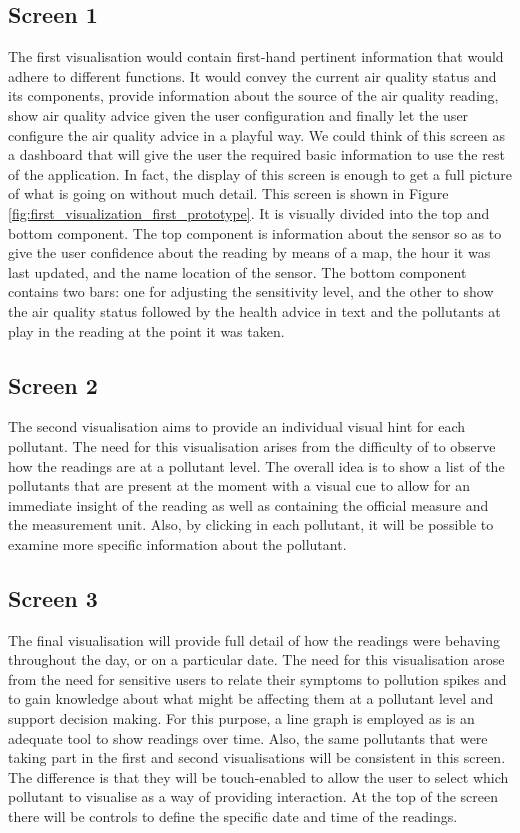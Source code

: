 \subsection{Screen 1}

The first visualisation would contain first-hand pertinent information that would adhere to different functions. It would convey the current air quality status and its components, provide information about the source of the air quality reading, show air quality advice given the user configuration and finally let the user configure the air quality advice in a playful way. We could think of this screen as a dashboard that will give the user the required basic information to use the rest of the application. In fact, the display of this screen is enough to get a full picture of what is going on without much detail.
This screen is shown in Figure \ref{fig:first_visualization_first_prototype}. It is visually divided into the top and bottom component. The top component is information about the sensor so as to give the user confidence about the reading by means of a map, the hour it was last updated, and the name location of the sensor. The bottom component contains two bars: one for adjusting the sensitivity level, and the other to show the air quality status followed by the health advice in text and the pollutants at play in the reading at the point it was taken. 

\subsection{Screen 2}

The second visualisation aims to provide an individual visual hint for each pollutant. The need for this visualisation arises from the difficulty of to observe how the readings are at a pollutant level. The overall idea is to show a list of the pollutants that are present at the moment with a visual cue to allow for an immediate insight of the reading as well as containing the official measure and the measurement unit. Also, by clicking in each pollutant, it will be possible to examine more specific information about the pollutant.

\subsection{Screen 3}

The final visualisation will provide full detail of how the readings were behaving throughout the day, or on a particular date. The need for this visualisation arose from the need for sensitive users to relate their symptoms to pollution spikes and to gain knowledge about what might be affecting them at a pollutant level and support decision making. For this purpose, a line graph is employed as is an adequate tool to show readings over time. Also, the same pollutants that were taking part in the first and second visualisations will be consistent in this screen. The difference is that they will be touch-enabled to allow the user to select which pollutant to visualise as a way of providing interaction. At the top of the screen there will be controls to define the specific date and time of the readings.
